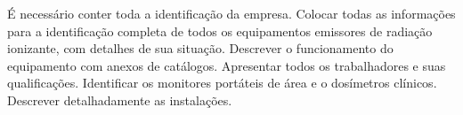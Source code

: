 \documentclass[
	12pt,				%
    oneside,			%
	a4paper,			%
	english,			%
	french,				%
	spanish,			%
	brazil,				%
	]{abntex2}
\begin{document}
É necessário conter toda a identificação da empresa. Colocar todas as informações para a identificação completa de todos os equipamentos emissores de radiação ionizante, com detalhes de sua situação. Descrever o funcionamento do equipamento com anexos de catálogos. Apresentar todos os trabalhadores e suas qualificações. Identificar os monitores portáteis de área e o dosímetros clínicos. Descrever detalhadamente as instalações.









%
%






\end{document}
